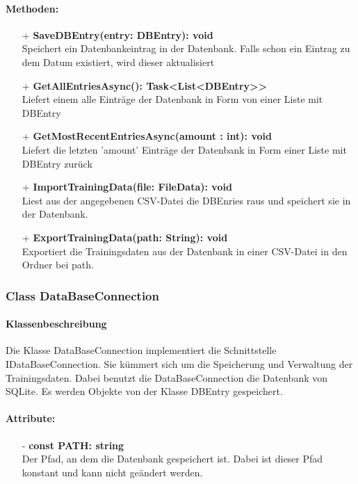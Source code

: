 \documentclass[a4paper,12pt]{article}
\begin{document}
	\paragraph{Methoden:}
	\begin{itemize}
		\item[+] \textbf{SaveDBEntry(entry: DBEntry): void}\\Speichert ein Datenbankeintrag in der \gls{Datenbank}. Falls schon ein Eintrag zu dem Datum existiert, wird dieser aktualisiert\\
		\item[+] \textbf{GetAllEntriesAsync(): Task<List<DBEntry>>}\\Liefert einem alle Einträge der Datenbank in Form von einer Liste mit DBEntry \\ 
		\item[+] \textbf{GetMostRecentEntriesAsync(amount : int): void}\\Liefert  die letzten 'amount' Einträge der Datenbank in Form einer Liste mit DBEntry zurück\\
		\item[+] \textbf{ImportTrainingData(file: FileData): void}\\Liest aus der angegebenen \gls{CSV}-Datei die DBEnries raus und speichert sie in der \gls{Datenbank}.\\
		\item[+] \textbf{ExportTrainingData(path: String): void}\\Exportiert die Trainingsdaten aus der \gls{Datenbank} in einer \gls{CSV}-Datei in den Ordner bei path. \\
	\end{itemize}

\subsubsection{Class DataBaseConnection}
	\paragraph{Klassenbeschreibung}
	Die Klasse DataBaseConnection implementiert die Schnittstelle IDataBaseConnection. Sie kümmert sich um die Speicherung und Verwaltung der Trainingsdaten. Dabei benutzt die DataBaseConnection die \gls{Datenbank} von SQLite. Es werden Objekte von der Klasse DBEntry gespeichert. 
	
	\paragraph{Attribute:}
	\begin{itemize}
		\item[-] \textbf{const PATH: string}\\Der Pfad, an dem die Datenbank gespeichert ist. Dabei ist dieser Pfad konstant und kann nicht geändert werden.
	\end{itemize}
\end{document}
